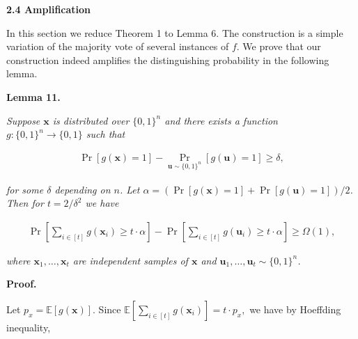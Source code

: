\documentclass[10pt,a4paper]{article}
\begin{document}
\par\medskip\noindent\textbf{
2.4 Amplification}\par




In this section we reduce Theorem 1 to Lemma 6. The construction is a simple variation of the majority vote of several instances of $f$. We prove that our construction indeed amplifies the distinguishing probability in the following lemma.\par





\par\medskip\noindent\textbf{
\textbf{Lemma 11}\textbf{.}
}\par



\emph{Suppose $\bm{x}$ is distributed over $\{0,1\}^{n}$ and there exists a function $g\colon\{0,1\}^{n}\to\{0,1\}$ such that}\par


\[\begin{gathered}
\Pr[g(\bm{x})=1]-\Pr_{\bm{u}\sim\{0,1\}^{n}}[g(\bm{u})=1]\geq\delta,
\end{gathered}\]


\emph{for some $\delta$ depending on $n$.
Let $\alpha=(\Pr[g(\bm{x})=1]+\Pr[g(\bm{u})=1])/2$.
Then for $t=2/\delta^{2}$ we have}\par


\[\begin{gathered}
\Pr\left[\sum_{i\in[t]}g(\bm{x}_{i})\geq t\cdot\alpha\right]-\Pr\left[\sum_{i\in[t]}g(\bm{u}_{i})\geq t\cdot\alpha\right]\geq\Omega(1),
\end{gathered}\]


\emph{where $\bm{x}_{1},\dots,\bm{x}_{t}$ are independent samples of $\bm{x}$ and $\bm{u}_{1},\dots,\bm{u}_{t}\sim\{0,1\}^{n}$.}\par






\par\medskip\noindent\textbf{Proof.}\par




Let $p_{x}=\mathbb{E}[g(\bm{x})]$.
Since
$\mathbb{E}\left[\sum_{i\in[t]}g(\bm{x}_{i})\right]=t\cdot p_{x},$
we have by Hoeffding inequality,\par
\end{document}
